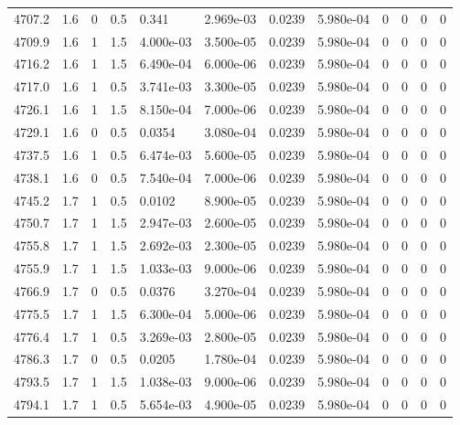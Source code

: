 \documentclass[preview]{standalone}
\begin{document}
{{{{{{{{{{{{{{{{{{{\begin{tabular}{L{1.2cm}C{1.2cm} C{0.3cm}C{0.5cm} C{1.4cm}C{1.4cm} C{1.4cm}C{1.4cm} C{1.6cm}C{1.6cm} C{1.6cm}C{1.6cm}}
  4707.2  &   1.6  & 0     & 0.5 &  0.341  & 2.969e-03  &  0.0239&   5.980e-04& 0 & 0   &  0 & 0  \\ 
  4709.9  &   1.6  & 1     & 1.5 &  4.000e-03  & 3.500e-05  &  0.0239&   5.980e-04& 0 & 0   &  0 & 0  \\ 
  4716.2  &   1.6  & 1     & 1.5 &  6.490e-04  & 6.000e-06  &  0.0239&   5.980e-04& 0 & 0   &  0 & 0  \\ 
  4717.0  &   1.6  & 1     & 0.5 &  3.741e-03  & 3.300e-05  &  0.0239&   5.980e-04& 0 & 0   &  0 & 0  \\ 
  4726.1  &   1.6  & 1     & 1.5 &  8.150e-04  & 7.000e-06  &  0.0239&   5.980e-04& 0 & 0   &  0 & 0  \\ 
  4729.1  &   1.6  & 0     & 0.5 &  0.0354  & 3.080e-04  &  0.0239&   5.980e-04& 0 & 0   &  0 & 0  \\ 
  4737.5  &   1.6  & 1     & 0.5 &  6.474e-03  & 5.600e-05  &  0.0239&   5.980e-04& 0 & 0   &  0 & 0  \\ 
  4738.1  &   1.6  & 0     & 0.5 &  7.540e-04  & 7.000e-06  &  0.0239&   5.980e-04& 0 & 0   &  0 & 0  \\ 
  4745.2  &   1.7  & 1     & 0.5 &  0.0102  & 8.900e-05  &  0.0239&   5.980e-04& 0 & 0   &  0 & 0  \\ 
  4750.7  &   1.7  & 1     & 1.5 &  2.947e-03  & 2.600e-05  &  0.0239&   5.980e-04& 0 & 0   &  0 & 0  \\ 
  4755.8  &   1.7  & 1     & 1.5 &  2.692e-03  & 2.300e-05  &  0.0239&   5.980e-04& 0 & 0   &  0 & 0  \\ 
  4755.9  &   1.7  & 1     & 1.5 &  1.033e-03  & 9.000e-06  &  0.0239&   5.980e-04& 0 & 0   &  0 & 0  \\ 
  4766.9  &   1.7  & 0     & 0.5 &  0.0376  & 3.270e-04  &  0.0239&   5.980e-04& 0 & 0   &  0 & 0  \\ 
  4775.5  &   1.7  & 1     & 1.5 &  6.300e-04  & 5.000e-06  &  0.0239&   5.980e-04& 0 & 0   &  0 & 0  \\ 
  4776.4  &   1.7  & 1     & 0.5 &  3.269e-03  & 2.800e-05  &  0.0239&   5.980e-04& 0 & 0   &  0 & 0  \\ 
  4786.3  &   1.7  & 0     & 0.5 &  0.0205  & 1.780e-04  &  0.0239&   5.980e-04& 0 & 0   &  0 & 0  \\ 
  4793.5  &   1.7  & 1     & 1.5 &  1.038e-03  & 9.000e-06  &  0.0239&   5.980e-04& 0 & 0   &  0 & 0  \\ 
  4794.1  &   1.7  & 1     & 0.5 &  5.654e-03  & 4.900e-05  &  0.0239&   5.980e-04& 0 & 0   &  0 & 0  \\ 

\end{tabular}}}}}}}}}}}}}}}}}}}}
\end{document}
